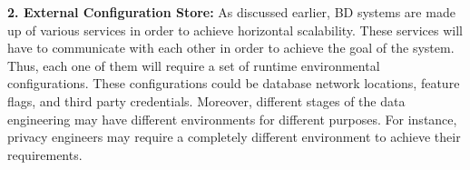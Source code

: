 \documentclass[a4paper,11pt,article,oneside]{memoir}
\begin{document}




\vspace{6px}
\textbf{2. External Configuration Store:} As discussed earlier, BD systems are made up of various services in order to achieve horizontal scalability. These services will have to communicate with each other in order to achieve the goal of the system. Thus, each one of them will require a set of runtime environmental configurations. These configurations could be database network locations, feature flags, and third party credentials. Moreover, different stages of the data engineering may have different environments for different purposes. For instance, privacy engineers may require a completely different environment to achieve their requirements. 
\end{document}

